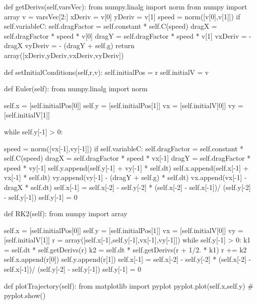 \begin{enumerate}
\begin{codeexample}
\begin{VerbatimOut}{\listingFile}
    def getDerivs(self,varsVec):
        from numpy.linalg import norm
        from numpy import array
        v = varsVec[2:]
        xDeriv = v[0]
        yDeriv = v[1]
        speed = norm([v[0],v[1]])
        if self.variableC:
            self.dragFactor = self.constant * self.C(speed)
        dragX = self.dragFactor * speed * v[0]
        dragY = self.dragFactor * speed * v[1]
        vxDeriv = - dragX
        vyDeriv = - (dragY + self.g)
        return array([xDeriv,yDeriv,vxDeriv,vyDeriv])
    
    def setInitialConditions(self,r,v):
        self.initialPos = r
        self.initialV = v

    def Euler(self):
        from numpy.linalg import norm

        self.x = [self.initialPos[0]]
        self.y = [self.initialPos[1]]
        vx = [self.initialV[0]]
        vy = [self.initialV[1]]

        while self.y[-1] > 0:

            speed = norm([vx[-1],vy[-1]])
            if self.variableC:
                self.dragFactor = self.constant * self.C(speed)
            dragX = self.dragFactor * speed * vx[-1]
            dragY = self.dragFactor * speed * vy[-1]
            self.y.append(self.y[-1] + vy[-1] * self.dt)
            self.x.append(self.x[-1] + vx[-1] * self.dt)
            vy.append(vy[-1] - (dragY + self.g) * self.dt)
            vx.append(vx[-1] - dragX * self.dt)
        self.x[-1] = self.x[-2] - self.y[-2] * (self.x[-2] - self.x[-1])/ (self.y[-2] - self.y[-1])
        self.y[-1] = 0



    def RK2(self):
        from numpy import array
        
        self.x = [self.initialPos[0]]
        self.y = [self.initialPos[1]]
        vx = [self.initialV[0]]
        vy = [self.initialV[1]]
        r = array([self.x[-1],self.y[-1],vx[-1],vy[-1]])
        while self.y[-1] > 0:
            k1 = self.dt * self.getDerivs(r)
            k2 = self.dt * self.getDerivs(r + 1/2. * k1)
            r += k2
            self.x.append(r[0])
            self.y.append(r[1])
        self.x[-1] = self.x[-2] - self.y[-2] * (self.x[-2] - self.x[-1])/ (self.y[-2] - self.y[-1])
        self.y[-1] = 0
            

        
    def plotTrajectory(self):
        from matplotlib import pyplot
        pyplot.plot(self.x,self.y)
        # pyplot.show()



\end{VerbatimOut}
\end{codeexample}
\end{enumerate}
